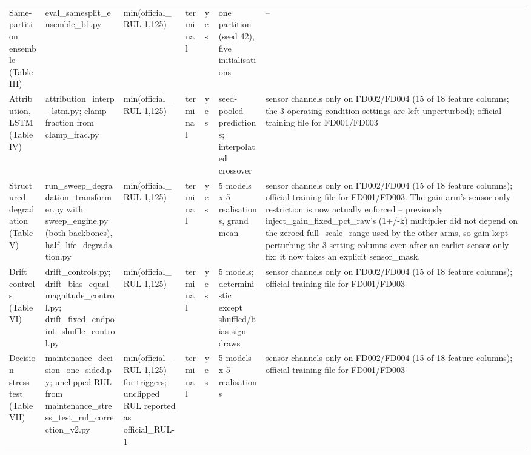 \documentclass[10pt,a4paper]{article}
\begin{document}
\begin{center}
\begin{longtable}{p{2.0cm}p{3.8cm}p{1.4cm}p{1.4cm}p{0.9cm}p{2.2cm}p{1.2cm}}
Same-partition ensemble (Table III) & eval\_\allowbreak samesplit\_\allowbreak ensemble\_\allowbreak b1\allowbreak .py & min(official\_\allowbreak RUL-1,125) & terminal & yes & one partition (seed 42), five initialisations & -- \\
Attribution, LSTM (Table IV) & attribution\_\allowbreak interp\_\allowbreak lstm\allowbreak .py; clamp fraction from clamp\_\allowbreak frac\allowbreak .py & min(official\_\allowbreak RUL-1,125) & terminal & yes & seed-pooled predictions; interpolated crossover & sensor channels only on FD002/FD004 (15 of 18 feature columns; the 3 operating-condition settings are left unperturbed); official training file for FD001/FD003 \\
Structured degradation (Table V) & run\_\allowbreak sweep\_\allowbreak degradation\_\allowbreak transformer\allowbreak .py with sweep\_\allowbreak engine\allowbreak .py (both backbones), half\_\allowbreak life\_\allowbreak degradation\allowbreak .py & min(official\_\allowbreak RUL-1,125) & terminal & yes & 5 models x 5 realisations, grand mean & sensor channels only on FD002/FD004 (15 of 18 feature columns); official training file for FD001/FD003. The gain arm's sensor-only restriction is now actually enforced -- previously inject\_\allowbreak gain\_\allowbreak fixed\_\allowbreak pct\_\allowbreak raw's (1+/-k) multiplier did not depend on the zeroed full\_\allowbreak scale\_\allowbreak range used by the other arms, so gain kept perturbing the 3 setting columns even after an earlier sensor-only fix; it now takes an explicit sensor\_\allowbreak mask. \\
Drift controls (Table VI) & drift\_\allowbreak controls\allowbreak .py; drift\_\allowbreak bias\_\allowbreak equal\_\allowbreak magnitude\_\allowbreak control\allowbreak .py; drift\_\allowbreak fixed\_\allowbreak endpoint\_\allowbreak shuffle\_\allowbreak control\allowbreak .py & min(official\_\allowbreak RUL-1,125) & terminal & yes & 5 models; deterministic except shuffled/bias sign draws & sensor channels only on FD002/FD004 (15 of 18 feature columns); official training file for FD001/FD003 \\
Decision stress test (Table VII) & maintenance\_\allowbreak decision\_\allowbreak one\_\allowbreak sided\allowbreak .py; unclipped RUL from maintenance\_\allowbreak stress\_\allowbreak test\_\allowbreak rul\_\allowbreak correction\_\allowbreak v2\allowbreak .py & min(official\_\allowbreak RUL-1,125) for triggers; unclipped RUL reported as official\_\allowbreak RUL-1 & terminal & yes & 5 models x 5 realisations & sensor channels only on FD002/FD004 (15 of 18 feature columns); official training file for FD001/FD003 \\

\end{longtable}
\end{center}
\end{document}
